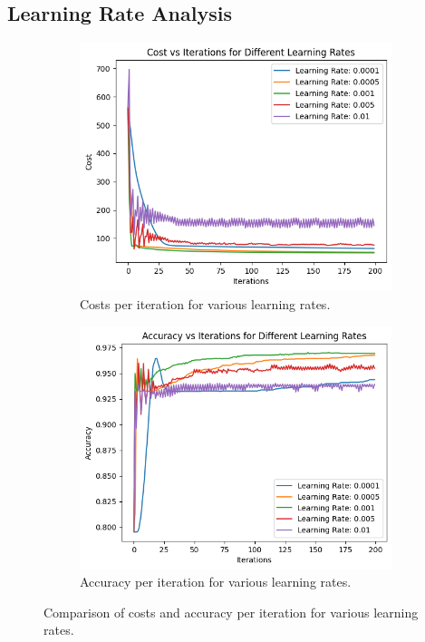 \documentclass[a4paper]{article}
\begin{document}
\subsection{Learning Rate Analysis}

\begin{figure}[htbp]
    \centering
    \begin{subfigure}[b]{0.49\linewidth}
        \centering
        \includegraphics[width=\linewidth]{1.21.png}
        \caption{\centering Costs per iteration for various learning rates.}
    \end{subfigure}
    \hfill
    \begin{subfigure}[b]{0.49\linewidth}
        \centering
        \includegraphics[width=\linewidth]{1.22.png}
        \caption{\centering Accuracy per iteration for various learning rates.}
    \end{subfigure}
    \caption{\centering Comparison of costs and accuracy per iteration for various learning rates.}
\end{figure}
\end{document}
